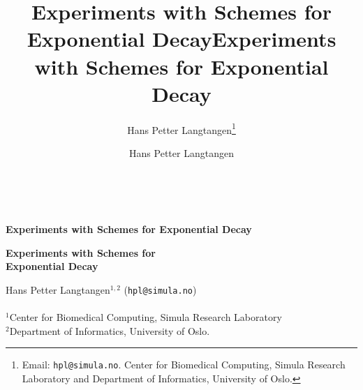 \documentclass[twoside]{book}
\begin{document}






\title{Experiments with Schemes for Exponential Decay}


\thispagestyle{empty}
\hbox{\ \ }
\vfill
\begin{center}
{\huge{\bfseries{Experiments with Schemes for Exponential Decay}}}


\title*{Experiments with Schemes for Exponential Decay}


\begin{center}
{\LARGE\bf Experiments with Schemes for \\ [1.5mm] Exponential Decay}
\end{center}




\author{Hans Petter Langtangen\footnote{Email: \texttt{hpl@simula.no}. Center for Biomedical Computing, Simula Research Laboratory and Department of Informatics, University of Oslo.}}

\vspace{1.3cm}

    {\Large\textsf{Hans Petter Langtangen${}^{1, 2}$ (\texttt{hpl@simula.no})}}\\ [3mm]
    
\ \\ [2mm]

{\large\textsf{${}^1$Center for Biomedical Computing, Simula Research Laboratory} \\ [1.5mm]}
{\large\textsf{${}^2$Department of Informatics, University of Oslo.} \\ [1.5mm]}

\author{Hans Petter Langtangen}


\end{center}
\end{document}
